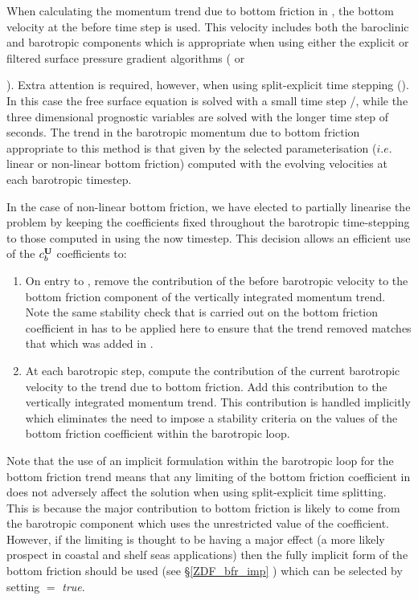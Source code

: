 When calculating the momentum trend due to bottom friction in , the
bottom velocity at the before time step is used. This velocity includes both the
baroclinic and barotropic components which is appropriate when using either the
explicit or filtered surface pressure gradient algorithms ( or 
{). Extra attention is required, however, when using 
split-explicit time stepping (). In this case the free surface 
equation is solved with a small time step /, while the three 
dimensional prognostic variables are solved with the longer time step 
of  seconds. The trend in the barotropic momentum due to bottom 
friction appropriate to this method is that given by the selected parameterisation 
($i.e.$ linear or non-linear bottom friction) computed with the evolving velocities 
at each barotropic timestep. 

In the case of non-linear bottom friction, we have elected to partially linearise 
the problem by keeping the coefficients fixed throughout the barotropic 
time-stepping to those computed in  using the now timestep. 
This decision allows an efficient use of the $c_b^{\mathbf{U}}$ coefficients to:

\begin{enumerate}
\item On entry to , remove the contribution of the before
barotropic velocity to the bottom friction component of the vertically
integrated momentum trend. Note the same stability check that is carried out 
on the bottom friction coefficient in  has to be applied here to
ensure that the trend removed matches that which was added in .
\item At each barotropic step, compute the contribution of the current barotropic
velocity to the trend due to bottom friction. Add this contribution to the
vertically integrated momentum trend. This contribution is handled implicitly which
eliminates the need to impose a stability criteria on the values of the bottom friction
coefficient within the barotropic loop. 
\end{enumerate}

Note that the use of an implicit formulation within the barotropic loop
for the bottom friction trend means that any limiting of the bottom friction coefficient 
in  does not adversely affect the solution when using split-explicit time 
splitting. This is because the major contribution to bottom friction is likely to come from 
the barotropic component which uses the unrestricted value of the coefficient. However, if the
limiting is thought to be having a major effect (a more likely prospect in coastal and shelf seas
applications) then the fully implicit form of the bottom friction should be used (see \S\ref{ZDF_bfr_imp} ) 
which can be selected by setting  $=$ \textit{true}.

}
